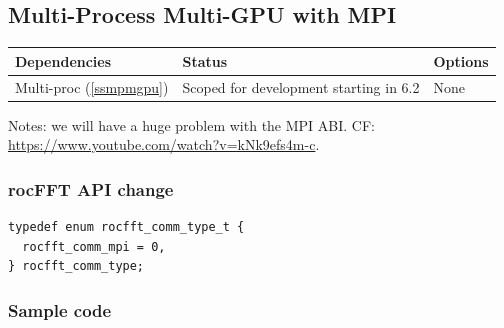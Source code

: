 \documentclass[12pt]{article}
\renewcommand{\(}{\left(}
\renewcommand{\)}{\right)}
\begin{document}
\newpage
\subsection{Multi-Process Multi-GPU with MPI}

\begin{center}
  \begin{tabular}{|l|l|l|}
    \hline
    Dependencies & Status & Options \\
    \hline
    Multi-proc (\ref{ssmpmgpu}) & Scoped for development starting in 6.2    & None \\
    \hline
  \end{tabular}
\end{center}


Notes: we will have a huge problem with the MPI ABI.  CF:
\url{https://www.youtube.com/watch?v=kNk9efs4m-c}. 

\subsubsection{rocFFT API change}
\begin{lstlisting}
typedef enum rocfft_comm_type_t {
  rocfft_comm_mpi = 0,
} rocfft_comm_type;
\end{lstlisting}

\subsubsection{Sample code}
\end{document}
